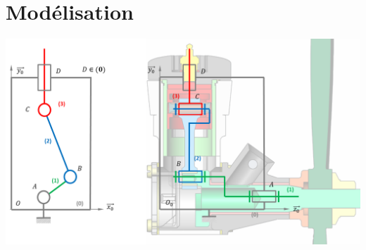 \documentclass[10pt,fleqn]{article} %
\begin{document}
\begin{multicols}{2}
\begin{obj}

\end{obj}


\section*{Modélisation}
\begin{center}
\includegraphics[width=\linewidth]{images/fig_06}
\end{center}


\end{multicols}

\end{document}
